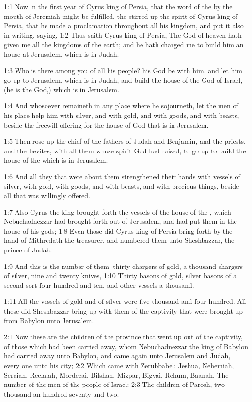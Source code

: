 

1:1 Now in the first year of Cyrus king of Persia, that the word of
the \LORD by the mouth of Jeremiah might be fulfilled, the \LORD stirred
up the spirit of Cyrus king of Persia, that he made a proclamation
throughout all his kingdom, and put it also in writing, saying, 1:2
Thus saith Cyrus king of Persia, The \LORD God of heaven hath given me
all the kingdoms of the earth; and he hath charged me to build him an
house at Jerusalem, which is in Judah.

1:3 Who is there among you of all his people? his God be with him, and
let him go up to Jerusalem, which is in Judah, and build the house of
the \LORD God of Israel, (he is the God,) which is in Jerusalem.

1:4 And whosoever remaineth in any place where he sojourneth, let the
men of his place help him with silver, and with gold, and with goods,
and with beasts, beside the freewill offering for the house of God
that is in Jerusalem.

1:5 Then rose up the chief of the fathers of Judah and Benjamin, and
the priests, and the Levites, with all them whose spirit God had
raised, to go up to build the house of the \LORD which is in Jerusalem.

1:6 And all they that were about them strengthened their hands with
vessels of silver, with gold, with goods, and with beasts, and with
precious things, beside all that was willingly offered.

1:7 Also Cyrus the king brought forth the vessels of the house of the
\LORD, which Nebuchadnezzar had brought forth out of Jerusalem, and had
put them in the house of his gods; 1:8 Even those did Cyrus king of
Persia bring forth by the hand of Mithredath the treasurer, and
numbered them unto Sheshbazzar, the prince of Judah.

1:9 And this is the number of them: thirty chargers of gold, a
thousand chargers of silver, nine and twenty knives, 1:10 Thirty
basons of gold, silver basons of a second sort four hundred and ten,
and other vessels a thousand.

1:11 All the vessels of gold and of silver were five thousand and four
hundred. All these did Sheshbazzar bring up with them of the captivity
that were brought up from Babylon unto Jerusalem.

2:1 Now these are the children of the province that went up out of the
captivity, of those which had been carried away, whom Nebuchadnezzar
the king of Babylon had carried away unto Babylon, and came again unto
Jerusalem and Judah, every one unto his city; 2:2 Which came with
Zerubbabel: Jeshua, Nehemiah, Seraiah, Reelaiah, Mordecai, Bilshan,
Mizpar, Bigvai, Rehum, Baanah. The number of the men of the people of
Israel: 2:3 The children of Parosh, two thousand an hundred seventy
and two.

